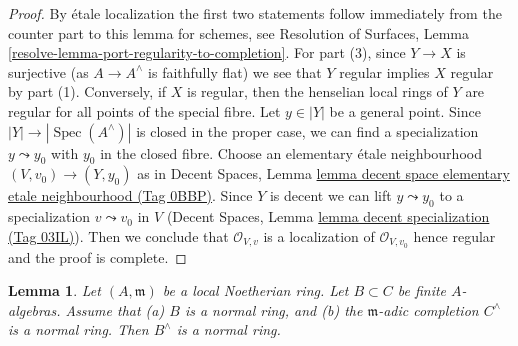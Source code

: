 \documentclass{amsart}
\theoremstyle{plain}
\newtheorem{lemma}[subsection]{Lemma}
\theoremstyle{definition}
\theoremstyle{remark}
\numberwithin{equation}{subsection}
\def\Spec{\mathop{\mathrm{Spec}}}
\begin{document}
\begin{proof}
By \'etale localization the first two statements follow
immediately from the counter part to this lemma for schemes, see
Resolution of Surfaces, Lemma \ref{resolve-lemma-port-regularity-to-completion}.
For part (3), since $Y \to X$ is surjective (as $A \to A^\wedge$
is faithfully flat) we see that $Y$ regular implies $X$ regular
by part (1). Conversely, if $X$ is regular, then the henselian
local rings of $Y$ are regular for all points of the special fibre.
Let $y \in |Y|$ be a general point.
Since $|Y| \to |\Spec(A^\wedge)|$ is closed in the proper
case, we can find a specialization $y \leadsto y_0$ with
$y_0$ in the closed fibre. Choose an elementary \'etale
neighbourhood $(V, v_0) \to (Y, y_0)$ as in
Decent Spaces, Lemma
\href{https://stacks.math.columbia.edu/tag/0BBP}{lemma decent space elementary etale neighbourhood (Tag 0BBP)}.
Since $Y$ is decent we can lift $y \leadsto y_0$ to a specialization
$v \leadsto v_0$ in $V$
(Decent Spaces, Lemma \href{https://stacks.math.columbia.edu/tag/03IL}{lemma decent specialization (Tag 03IL)}).
Then we conclude that
$\mathcal{O}_{V, v}$ is a localization of $\mathcal{O}_{V, v_0}$
hence regular and the proof is complete.
\end{proof}


\begin{lemma}
\label{resolve-lemma-algebra-helper}
Let $(A, \mathfrak m)$ be a local Noetherian ring. Let $B \subset C$
be finite $A$-algebras. Assume that (a) $B$ is a normal ring, and
(b) the $\mathfrak m$-adic completion $C^\wedge$ is a normal ring.
Then $B^\wedge$ is a normal ring.
\end{lemma}
\end{document}
